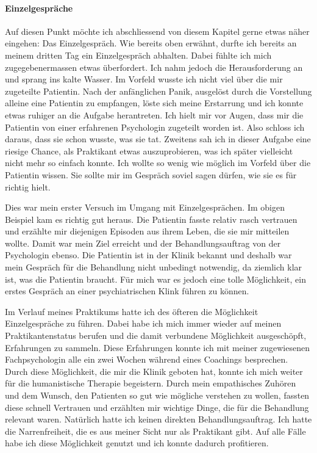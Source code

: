 \documentclass[jou,apacite]{apa6}
\begin{document}
\paragraph{Einzelgespräche}
Auf diesen Punkt möchte ich abschliessend von diesem Kapitel gerne etwas näher eingehen: Das Einzelgespräch. Wie bereits oben erwähnt, durfte ich bereits an meinem dritten Tag ein Einzelgespräch abhalten. Dabei fühlte ich mich zugegebenermassen etwas überfordert. Ich nahm jedoch die Herausforderung an und sprang ins kalte Wasser. Im Vorfeld wusste ich nicht viel über die mir zugeteilte Patientin. Nach der anfänglichen Panik, ausgelöst durch die Vorstellung alleine eine Patientin zu empfangen, löste sich meine Erstarrung und ich konnte etwas ruhiger an die Aufgabe herantreten. Ich hielt mir vor Augen, dass mir die Patientin von einer erfahrenen Psychologin zugeteilt worden ist. Also schloss ich daraus, dass sie schon wusste, was sie tat. Zweitens sah ich in dieser Aufgabe eine riesige Chance, als Praktikant etwas auszuprobieren, was ich später vielleicht nicht mehr so einfach konnte. Ich wollte so wenig wie möglich im Vorfeld über die Patientin wissen. Sie sollte mir im Gespräch soviel sagen dürfen, wie sie es für richtig hielt. 

Dies war mein erster Versuch im Umgang mit Einzelgesprächen. Im obigen Beispiel kam es richtig gut heraus. Die Patientin fasste relativ rasch vertrauen und erzählte mir diejenigen Episoden aus ihrem Leben, die sie mir mitteilen wollte. Damit war mein Ziel erreicht und der Behandlungsauftrag von der Psychologin ebenso. Die Patientin ist in der Klinik bekannt und deshalb war mein Gespräch für die Behandlung nicht unbedingt notwendig, da ziemlich klar ist, was die Patientin braucht. Für mich war es jedoch eine tolle Möglichkeit, ein erstes Gespräch an einer psychiatrischen Klink führen zu können.

Im Verlauf meines Praktikums hatte ich des öfteren die Möglichkeit Einzelgespräche zu führen. Dabei habe ich mich immer wieder auf meinen Praktikantenstatus berufen und die damit verbundene Möglichkeit ausgeschöpft, Erfahrungen zu sammeln. Diese Erfahrungen konnte ich mit meiner zugewiesenen Fachpsychologin alle ein zwei Wochen während eines Coachings besprechen. Durch diese Möglichkeit, die mir die Klinik geboten hat, konnte ich mich weiter für die humanistische Therapie begeistern. Durch mein empathisches Zuhören und dem Wunsch, den Patienten so gut wie mögliche verstehen zu wollen, fassten diese schnell Vertrauen und erzählten mir wichtige Dinge, die für die Behandlung relevant waren. Natürlich hatte ich keinen direkten Behandlungsauftrag. Ich hatte die Narrenfreiheit, die es aus meiner Sicht nur als Praktikant gibt. Auf alle Fälle habe ich diese Möglichkeit genutzt und ich konnte dadurch profitieren.
\end{document}
